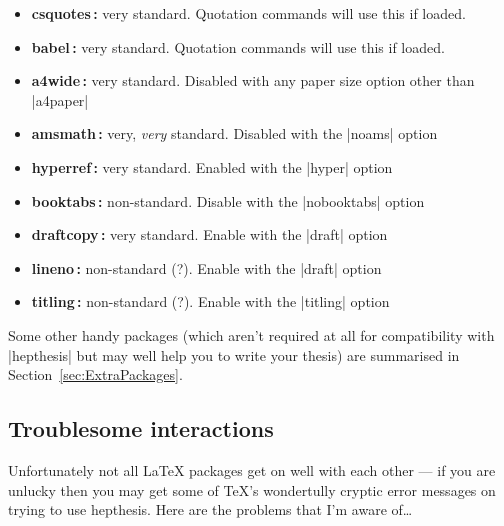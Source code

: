 \documentclass[12pt]{scrartcl}
\newcommand{\texpkg}[1]{#1}
\begin{document}
\begin{itemize}
\item \textbf{csquotes\,\cite{csquotes}:} very standard. Quotation commands will use this if loaded.
\item \textbf{babel\,\cite{babel}:} very standard. Quotation commands will use this if loaded.
\item \textbf{a4wide\,\cite{a4wide}:} very standard. Disabled with any paper size option other than |a4paper|
\item \textbf{amsmath\,\cite{amsmath}:} very, \emph{very} standard. Disabled with the |noams| option
\item \textbf{hyperref\,\cite{hyperref}:} very standard. Enabled with the |hyper| option
\item \textbf{booktabs\,\cite{booktabs}:} non-standard. Disable with the |nobooktabs| option
\item \textbf{draftcopy\,\cite{draftcopy}:} very standard. Enable with the |draft| option
\item \textbf{lineno\,\cite{lineno}:} non-standard (?). Enable with the |draft| option
\item \textbf{titling\,\cite{titling}:} non-standard (?). Enable with the |titling| option
\end{itemize}

Some other handy packages (which aren't required at all for compatibility with
|hepthesis| but may well help you to write your thesis) are summarised in
Section~\ref{sec:ExtraPackages}.

\subsection{Troublesome interactions}
Unfortunately not all \LaTeX{} packages get on well with each other --- if
you are unlucky then you may get some of \TeX's wondertully cryptic error
messages on trying to use \texpkg{hepthesis}. Here are the problems that I'm
aware of\dots
\end{document}
